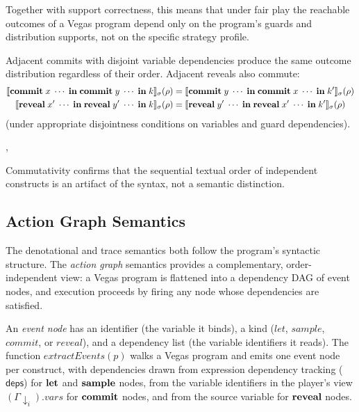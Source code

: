 \documentclass[11pt]{article}
\begin{document}
\noindent
Together with support correctness, this means that under fair play the
reachable outcomes of a Vegas program depend only on the program's guards and
distribution supports, not on the specific strategy profile.

\begin{theorem}[Commutativity]\label{thm:comm}
Adjacent commits with disjoint variable dependencies produce the same outcome
distribution regardless of their order. Adjacent reveals also commute:
\begin{align*}
  \llbracket \mathbf{commit}\;x\;\cdots\;\mathbf{in}\;\mathbf{commit}\;y\;\cdots\;\mathbf{in}\;k \rrbracket_{\sigma}(\rho)
  &= \llbracket \mathbf{commit}\;y\;\cdots\;\mathbf{in}\;\mathbf{commit}\;x\;\cdots\;\mathbf{in}\;k' \rrbracket_{\sigma}(\rho) \\
  \llbracket \mathbf{reveal}\;x'\;\cdots\;\mathbf{in}\;\mathbf{reveal}\;y'\;\cdots\;\mathbf{in}\;k \rrbracket_{\sigma}(\rho)
  &= \llbracket \mathbf{reveal}\;y'\;\cdots\;\mathbf{in}\;\mathbf{reveal}\;x'\;\cdots\;\mathbf{in}\;k' \rrbracket_{\sigma}(\rho)
\end{align*}
(under appropriate disjointness conditions on variables and
guard dependencies).

\noindent{},
\end{theorem}

\noindent
Commutativity confirms that the sequential textual order of independent
constructs is an artifact of the syntax, not a semantic distinction.


\subsection{Action Graph Semantics}\label{sec:actiongraph}

The denotational and trace semantics both follow the program's syntactic
structure. The \emph{action graph} semantics provides a complementary,
order-independent view: a Vegas program is flattened into a dependency DAG
of event nodes, and execution proceeds by firing any node whose dependencies
are satisfied.

\begin{definition}
An \emph{event node} has an identifier (the variable it binds), a kind
($\mathit{let}$, $\mathit{sample}$, $\mathit{commit}$, or $\mathit{reveal}$),
and a dependency list (the variable identifiers it reads). The function
$\mathit{extractEvents}(p)$ walks a Vegas program and emits one event node per
construct, with dependencies drawn from expression dependency tracking
($\mathsf{deps}$) for $\mathbf{let}$ and $\mathbf{sample}$ nodes, from the variable
identifiers in the player's view
$(\Gamma\!\!\downarrow_i).\mathit{vars}$ for $\mathbf{commit}$ nodes, and from the
source variable for $\mathbf{reveal}$ nodes.
\end{definition}
\end{document}
